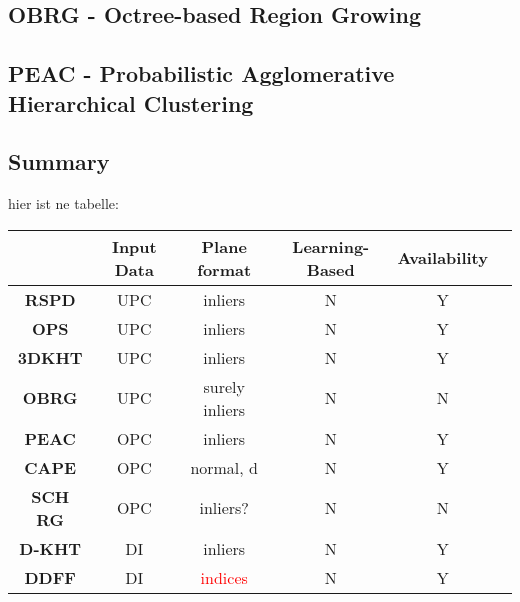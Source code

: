 \documentclass[main.tex]{subfiles}
\begin{document}
\subsection*{OBRG - Octree-based Region Growing}
\subsection*{PEAC - Probabilistic Agglomerative Hierarchical Clustering}

\subsection*{Summary}
hier ist ne tabelle:
\begin{table}[!h]
    \centering
    \begin{tabular}{|c|c|c|c|c|c}
        \hline
                             & \textbf{Input Data} & \textbf{Plane format}                 & \textbf{Learning-Based} & \textbf{Availability} \\ \hline
        \textbf{RSPD}        & UPC                 & inliers                               & N                       & Y                     \\ \hline
        \textbf{OPS}         & UPC                 & inliers                               & N                       & Y                     \\ \hline
        \textbf{3DKHT}       & UPC                 & inliers                               & N                       & Y                     \\ \hline
        \textbf{OBRG}        & UPC                 & surely inliers                        & N                       & N                     \\ \hline
        \textbf{PEAC}        & OPC                 & inliers                               & N                       & Y                     \\ \hline
        \textbf{CAPE}        & OPC                 & normal, d                             & N                       & Y                     \\ \hline
        \textbf{SCH RG}      & OPC                 & inliers?                              & N                       & N                     \\ \hline
        \textbf{D-KHT}       & DI                  & inliers                               & N                       & Y                     \\ \hline
        \textbf{DDFF}        & DI                  & \textcolor{red}{indices}              & N                       & Y                     \\ \hline

\end{tabular}
\end{table}
\end{document}
